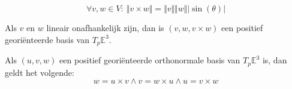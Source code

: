 \documentclass[main.tex]{subfiles}
\begin{document}
\begin{st}
  \[ \forall v,w \in V:\ \Vert v \times w\Vert = \Vert v \Vert \Vert w \Vert |\sin(\theta)| \]
\end{st}

\begin{st}
  Als $v$ en $w$ lineair onafhankelijk zijn, dan is $(v,w,v\times w)$ een positief geori\"enteerde basis van $T_{p}\mathbb{E}^{3}$.
\end{st}

\begin{st}
  Als $(u,v,w)$ een positief geori\"enteerde orthonormale basis van $T_{p}\mathbb{E}^{3}$ is, dan geldt het volgende:
  \[ w = u \times v \wedge v = w \times u \wedge u = v \times w \]
\end{st}
\end{document}

